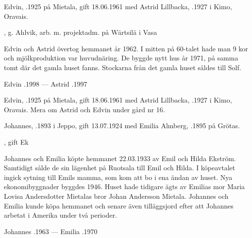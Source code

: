 Edvin, .1925 på Mietala, gift  18.06.1961 med Astrid Lillbacka, .1927 i Kimo, Oravais.
\begin{jhchildren}
  \item {}
  \item {}, g. Ahlvik, arb. m. projektadm. på Wärtsilä i Vasa
\end{jhchildren}

Edvin och Astrid övertog hemmanet år 1962. I mitten på 60-talet hade man 9 kor och mjölkproduktion var huvudnäring. De  byggde nytt hus år 1971, på samma tomt där det gamla huset fanns. Stockarna från det gamla huset såldes till Solf.

Edvin .1998  ---  Astrid .1997



Edvin, .1925 på Mietala, gift  18.06.1961 med Astrid Lillbacka, .1927 i Kimo, Oravais. Mera om Astrid och Edvin under gård nr 16.\jhvspace{}



Johannes, .1893 i Jeppo,  gift 13.07.1924 med Emilia Almberg, .1895 på Grötas.
\begin{jhchildren}
  \item {}
  \item {}, gift Ek
\end{jhchildren}

Johannes och Emilia köpte hemmanet 22.03.1933 av Emil och Hilda Ekström. Samtidigt sålde de sin lägenhet på  Ruotsala till Emil och Hilda. I köpeavtalet ingick sytning till Emils mamma, som kom att bo i ena ändan av huset. Nya ekonomibyggnader byggdes 1946. Huset hade tidigare ägts av Emilias mor Maria Lovisa Andersdotter Mietalas bror Johan Andersson Mietala. Johannes och Emilia kunde köpa hemmanet och senare även tilläggsjord efter att Johannes arbetat i Amerika under två perioder.

Johannes .1963  ---  Emilia .1970


